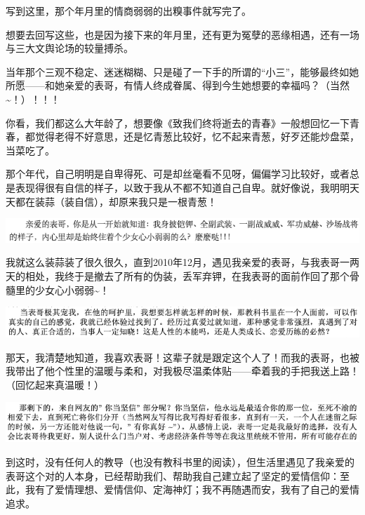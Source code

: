 \documentclass[9pt, b5paper]{article}
\begin{document}
写到这里，那个年月里的情商弱弱的出糗事件就写完了。

想要去回写这些，也是因为接下来的年月里，还有更为冤孽的恶缘相遇，还有一场与三大文舆论场的较量搏杀。

当年那个三观不稳定、迷迷糊糊、只是碰了一下手的所谓的“小三”，能够最终如她所愿——和她亲爱的表哥，有情人终成眷属、得到今生她想要的幸福吗？（当然\textasciitilde{}！）！！！

你看，我们都这么大年龄了，想要像《致我们终将逝去的青春》一般想回忆一下青春，都觉得老得不好意思，还是忆青葱比较好，忆不起来青葱，好歹还能炒盘菜，当菜吃了。 

那个年代，自己明明是自卑得死、可是却丝毫看不见呀，偏偏学习比较好，或者总是表现得很有自信的样子，以致于我从不都不知道自己自卑。就好像说，我明明天天都在装蒜（装自信），却原来我只是一根青葱！

\begin{center}
\includegraphics[width=.9\linewidth]{./pic/readme_20210503_173325.png}
\end{center}

我就这么装蒜装了很久很久，直到2010年12月，遇见我亲爱的表哥，与我表哥一两天的相处，我终于是撤去了所有的伪装，丢军弃钾，在我表哥的面前作回了那个骨髓里的少女心小弱弱\textasciitilde{}！

\begin{center}
\includegraphics[width=.9\linewidth]{./pic/readme_20210503_173454.png}
\end{center}

那天，我清楚地知道，我喜欢表哥！这辈子就是跟定这个人了！而我的表哥，也被我带出了他个性里的温暖与柔和，对我极尽温柔体贴——牵着我的手把我送上路！（回忆起来真温暖！）

\begin{center}
\includegraphics[width=.9\linewidth]{./pic/readme_20210503_173730.png}
\end{center}

到这时，没有任何人的教导（也没有教科书里的阅读），但生活里遇见了我亲爱的表哥这个对的人本身，已经帮助我们、帮助我自己建立起了坚定的爱情信仰：至此，我有了爱情理想、爱情信仰、定海神灯；我不再随遇而安，我有了自己的爱情追求。
\end{document}
